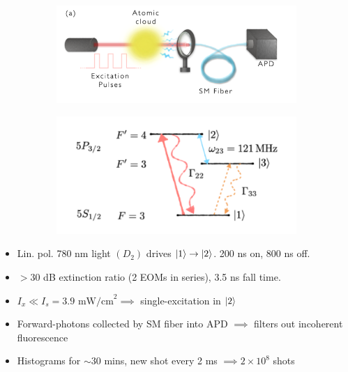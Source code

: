 \documentclass{beamer}
\theoremstyle{definition}
\begin{document}
\begin{frame}
	
	
	\begin{figure}[!htb]
		\begin{subfigure}{0.55\textwidth}
			\includegraphics[width=\textwidth]{experiment.png}
		\end{subfigure}
		\begin{subfigure}{0.44\textwidth}
			\includegraphics[width=\textwidth]{Rb85_levels.png}
		\end{subfigure}
	\end{figure}
	
\begin{itemize}
	\item Lin. pol. 780 nm light $(D_2)$ drives $\ket{1}\to \ket{2}$. 200 ns on, 800 ns off.  
	\item $> 30$ dB extinction ratio (2 EOMs in series), 3.5 ns fall time.
	\item $I_x \ll I_s = 3.9 \text{ mW/cm}^2 \implies$ single-excitation in $\ket{2}$
	\item Forward-photons collected by SM fiber into APD $\implies$ filters out incoherent fluorescence
	\item Histograms for $\sim$30 mins, new shot every 2 ms $\implies 2\times 10^8$ shots 
	
\end{itemize}
\end{frame}
\end{document}

